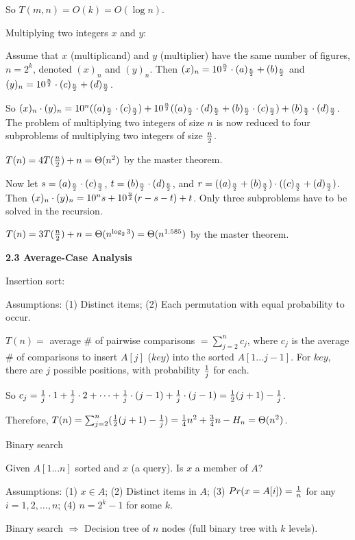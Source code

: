 So $T(m,n)=O(k)=O(\log n)$.



Multiplying two integers $x$ and $y$: 

Assume that $x$ (multiplicand) and $y$ (multiplier) 
have the same number of figures, $n=2^k$,
denoted $(x)_n$ and $(y)_n$.
Then $(x)_n=10^{n\over2}\cdot(a)_{n\over2}+(b)_{n\over2}$ and
$(y)_n=10^{n\over2}\cdot(c)_{n\over2}+(d)_{n\over2}$.

So $(x)_n\cdot(y)_n=10^n((a)_{n\over2}\cdot (c)_{n\over2})+
10^{n\over2}((a)_{n\over2}\cdot (d)_{n\over2}+ (b)_{n\over2}\cdot
(c)_{n\over2})+(b)_{n\over2}\cdot (d)_{n\over2}$. The problem of 
multiplying two integers of size $n$ is now reduced to four subproblems
of multiplying two integers of size $n\over2$.

$T(n)=4T({n\over2})+n=\Theta(n^2)$ by the master theorem.

Now let $s=(a)_{n\over2}\cdot (c)_{n\over2}$,
$t=(b)_{n\over2}\cdot (d)_{n\over2}$, and
$r=((a)_{n\over2}+(b)_{n\over2})\cdot((c)_{n\over2}+(d)_{n\over2})$.
Then $(x)_n\cdot(y)_n=10^ns+10^{n\over2}(r-s-t)+t$. Only three
subproblems have to be solved in the recursion.

$T(n)=3T({n\over2})+n=\Theta(n^{\log_23})=\Theta(n^{1.585})$ 
by the master theorem.


    \textbf{2.3 Average-Case Analysis}

Insertion sort:

Assumptions: (1) Distinct items; (2) Each permutation with equal
probability to occur.

$T(n)=$ average \# of pairwise comparisons $=\sum_{j=2}^n c_j$, where
$c_j$ is the average \# of comparisons to insert $A[j]$ ($key$) into the sorted
$A[1\ldots j-1]$. For $key$, there are $j$ possible positions, with 
probability ${1\over j}$ for each.

So $c_j={1\over j}\cdot 1+{1\over j}\cdot 2+\cdots+{1\over j}\cdot (j-1)
+{1\over j}\cdot (j-1)={1\over2}(j+1)-{1\over j}$.

Therefore, $T(n)=\sum_{j=2}^n({1\over2}(j+1)-{1\over j})
={1\over4}n^2+{3\over4}n-H_n=\Theta(n^2)$.


Binary search

Given $A[1\ldots n]$ sorted and $x$ (a query). Is $x$ a member of $A$?


Assumptions: (1) $x\in A$; (2) Distinct items in $A$; (3)
$Pr(x=A[i])={1\over n}$ for any $i=1,2,\ldots,n$; (4) $n=2^k-1$ for some $k$.

Binary search $\Rightarrow$ Decision tree of $n$ nodes (full binary tree
with $k$ levels).

